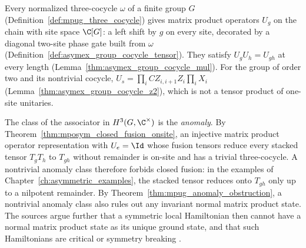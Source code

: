 \begin{remark}%
    \label{rem:mposym_group_cocycle}
    Every normalized three-cocycle $\omega$ of a finite group $G$
    (Definition~\ref{def:mpug_three_cocycle}) gives matrix product operators
    $U_g$ on the chain with site space $\C[G]$: a left shift by $g$ on every
    site, decorated by a diagonal two-site phase gate built from $\omega$
    (Definition~\ref{def:asymex_group_cocycle_tensor}). They satisfy
    $U_gU_h=U_{gh}$ at every length
    (Lemma~\ref{thm:asymex_group_cocycle_mul}). For the group of order two
    and its nontrivial cocycle, $U_s=\prod_iCZ_{i,i+1}Z_i\prod_iX_i$
    (Lemma~\ref{thm:asymex_group_cocycle_z2}), which is not a tensor
    product of one-site unitaries.

    The class of the associator in $H^3(G,\C^\times)$ is the
    \emph{anomaly}. By Theorem~\ref{thm:mposym_closed_fusion_onsite}, an
    injective matrix product operator representation with $U_e=\Id$ whose
    fusion tensors reduce every stacked tensor $T_gT_h$ to $T_{gh}$ without
    remainder is on-site and has a trivial three-cocycle. A nontrivial
    anomaly class therefore forbids closed fusion: in the examples of
    Chapter~\ref{ch:asymmetric_examples}, the stacked tensor reduces onto
    $T_{gh}$ only up to a nilpotent remainder. By
    Theorem~\ref{thm:mpug_anomaly_obstruction}, a nontrivial anomaly class
    also rules out any invariant normal matrix product state. The sources
    argue further that a symmetric local Hamiltonian then cannot have a
    normal matrix product state as its unique ground state, and that such
    Hamiltonians are critical or symmetry breaking
    \cite{ChenLiuWen2011CZX,GarreRubio2023MPOSym,Cirac2021Matrix}.
\end{remark}

